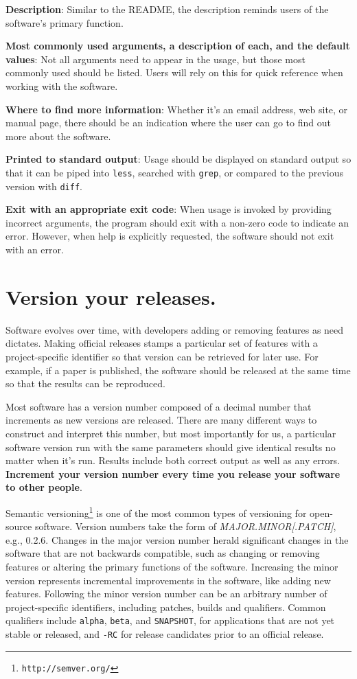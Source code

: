\documentclass[10pt,letterpaper]{article}
\newcommand{\withurl}[2]{{#1}\footnote{\texttt{#2}}}
\begin{document}
\textbf{Description}: Similar to the README, the
description reminds users of the software's primary function.

\textbf{Most commonly used arguments, a description of each, and the
default values}: Not all arguments need to appear in the usage, but those most
commonly used should be listed. Users will rely on this for
quick reference when working with the software.

\textbf{Where to find more information}: Whether it's an email address, web
site, or manual page, there should be an indication where the user can go
to find out more about the software.

\textbf{Printed to standard output}: Usage should be displayed on standard output so that it can be piped into
\texttt{less}, searched with \texttt{grep}, or compared to the previous
version with \texttt{diff}.

\textbf{Exit with an appropriate exit code}: When usage is invoked by
providing incorrect arguments, the program should exit with a non-zero
code to indicate an error. However, when help is explicitly requested,
the software should not exit with an error.

\section{Version your releases.}

Software evolves over time, with developers adding or removing features as need
dictates. Making official releases stamps a particular set of features with a
project-specific identifier so that version can be retrieved for later use. For
example, if a paper is published, the software should be released at the same
time so that the results can be reproduced. 

Most software has a version number composed of a decimal number that
increments as new versions are released. 
There are many different ways
to construct and interpret this number, but most importantly for us, a
particular software version run with the same parameters should give
identical results no matter when it's run. Results include both correct
output as well as any errors.
\textbf{Increment your version number every time you release your software to
other people}.

\withurl{Semantic versioning}{http://semver.org/} is one of the most common
types of versioning for open-source software. Version numbers take the
form of \emph{MAJOR.MINOR{[}.PATCH{]}}, e.g., 0.2.6.
Changes in the major
version number herald significant changes in the software that are not
backwards compatible, such as changing or removing features or altering
the primary functions of the software. Increasing the minor version
represents incremental improvements in the software, like adding new
features. Following the minor version number can be an arbitrary number
of project-specific identifiers, including patches, builds and qualifiers.
Common qualifiers include \texttt{alpha}, \texttt{beta}, and \texttt{SNAPSHOT},
for applications that are
not yet stable or released, and \texttt{-RC} for release candidates prior
to an official release.
\end{document}
